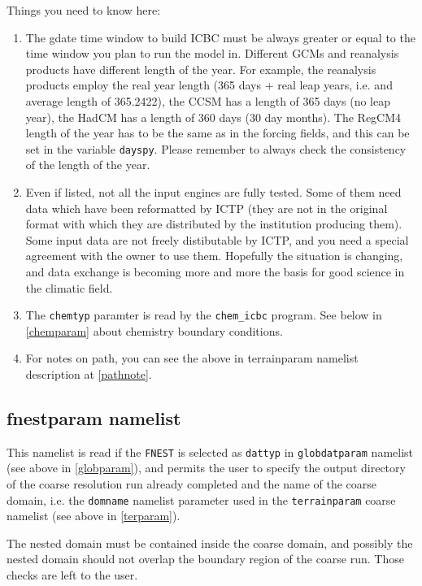 Things you need to know here:

\begin{enumerate}
\item The gdate time window to build ICBC must be always greater or equal to
the time window you plan to run the model in.
Different GCMs and reanalysis products have different length of the year.
For example, the reanalysis products employ the real year length (365 days +
real leap years, i.e. and average length of 365.2422), the CCSM has a length
of 365 days (no leap year), the HadCM has a length of 360 days (30 day months).
The RegCM4 length of the year has to be the same as in the forcing fields, and
this can be set in the variable \verb=dayspy=.
Please remember to always check the consistency of the length of the year.
\item Even if listed, not all the input engines are fully tested. Some of them
need data which have been reformatted by ICTP (they are not in the original
format with which they are distributed by the institution producing them).
Some input data are not freely distibutable by ICTP, and you need a special
agreement with the owner to use them.
Hopefully the situation is changing, and data exchange is becoming more and more
the basis for good science in the climatic field.
\item The \verb=chemtyp= paramter is read by the \verb=chem_icbc= program.
See below in \ref{chemparam} about chemistry boundary conditions.
\item For notes on path, you can see the above in terrainparam namelist
description at \ref{pathnote}.
\end{enumerate}

\subsection{fnestparam namelist}

This namelist is read if the \verb=FNEST= is selected as \verb=dattyp= in
\verb=globdatparam= namelist (see above in \ref{globparam}), and permits
the user to specify the output directory of the coarse resolution run
already completed and the name of the coarse domain, i.e. the \verb=domname=
namelist parameter used in the \verb=terrainparam= coarse namelist
(see above in \ref{terparam}).

The nested domain must be contained inside the coarse domain, and possibly
the nested domain should not overlap the boundary region of the coarse run.
Those checks are left to the user.

